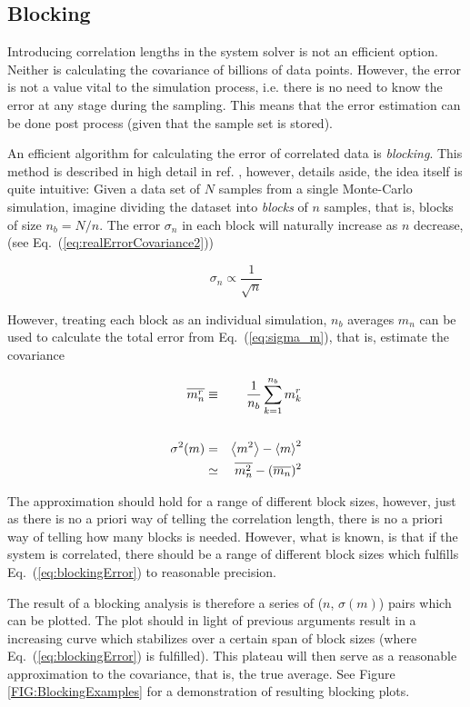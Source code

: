 \subsection{Blocking}

Introducing correlation lengths in the system solver is not an efficient option. Neither is calculating the covariance of billions of data points. However, the error is not a value vital to the simulation process, i.e. there is no need to know the error at any stage during the sampling. This means that the error estimation can be done post process (given that the sample set is stored).

An efficient algorithm for calculating the error of correlated data is \textit{blocking}. This method is described in high detail in ref. \cite{flyvbjerg:461}, however, details aside, the idea itself is quite intuitive: Given a data set of $N$ samples from a single Monte-Carlo simulation, imagine dividing the dataset into \textit{blocks} of $n$ samples, that is, blocks of size  $n_b=N/n$. The error $\sigma_n$ in each block will naturally increase as $n$ decrease, (see Eq.~(\ref{eq:realErrorCovariance2}))

\begin{equation}
 \sigma_n \propto \frac{1}{\sqrt{n}}
\end{equation}


However, treating each block as an individual simulation, $n_b$ averages $m_n$ can be used to calculate the total error from Eq.~(\ref{eq:sigma_m}), that is, estimate the covariance

\begin{eqnarray}
  \overline{m_n^r} &\equiv& \frac{1}{n_b}\sum_{k=1}^{n_b} m_k^r \\
\nonumber\\
  \sigma^2(m) &=& \left< m^2 \right> - \left< m \right>^2 \nonumber\\
              &\simeq& \overline{m_n^2} - (\overline{m_n})^2 \label{eq:blockingError}
\end{eqnarray}

The approximation should hold for a range of different block sizes, however, just as there is no a priori way of telling the correlation length, there is no a priori way of telling how many blocks is needed. However, what is known, is that if the system is correlated, there should be a range of different block sizes which fulfills Eq.~(\ref{eq:blockingError}) to reasonable precision. 

The result of a blocking analysis is therefore a series of ($n$, $\sigma(m)$) pairs which can be plotted. The plot should in light of previous arguments result in a increasing curve which stabilizes over a certain span of block sizes (where Eq.~(\ref{eq:blockingError}) is fulfilled). This plateau will then serve as a reasonable approximation to the covariance, that is, the true average. See Figure \ref{FIG:BlockingExamples} for a demonstration of resulting blocking plots.

